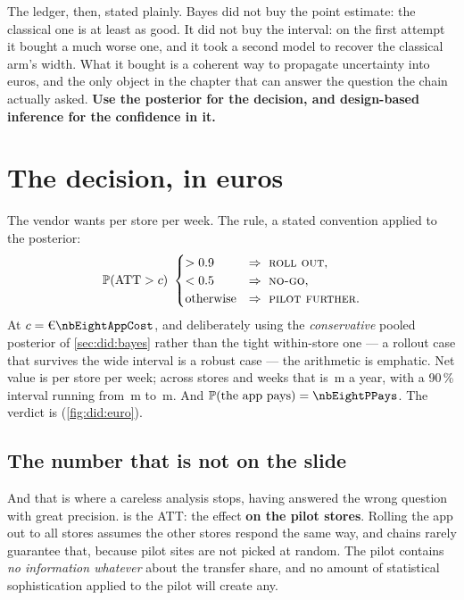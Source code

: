 The ledger, then, stated plainly. Bayes did not buy the point estimate: the classical one is at
least as good. It did not buy the interval: on the first attempt it bought a much worse one, and it
took a second model to recover the classical arm's width. What it bought is a coherent way to
propagate uncertainty into euros, and the only object in the chapter that can answer the question
the chain actually asked. \textbf{Use the posterior for the decision, and design-based inference for
the confidence in it.}

\section{The decision, in euros}
\label{sec:did:euro}

The vendor wants \eur{\nbEightAppCost} per store per week. The rule, a stated convention applied to
the posterior:
%
\begin{equation}
  \operatorname{\mathbb{P}}(\text{ATT} > c)\ \begin{cases}
    > 0.9 & \Rightarrow\ \textsc{roll out},\\
    < 0.5 & \Rightarrow\ \textsc{no-go},\\
    \text{otherwise} & \Rightarrow\ \textsc{pilot further}.
  \end{cases}
  \label{eq:did:rule}
\end{equation}
%
At $c = \eur{\nbEightAppCost}$, and deliberately using the \emph{conservative} pooled posterior of
\cref{sec:did:bayes} rather than the tight within-store one --- a rollout case that survives the wide
interval is a robust case --- the arithmetic is emphatic. Net value is \eur{\nbEightNetMean} per
store per week; across \nbEightNChain{} stores and \nbEightWeeksYear{} weeks that is
\eur{\nbEightAnnualMeanM}\,m a year, with a 90\,\% interval running from
\eur{\nbEightAnnualLoM}\,m to \eur{\nbEightAnnualHiM}\,m. And
$\Prob(\text{the app pays}) = \nbEightPPays$. The verdict is \textbf{\nbEightDecision}
(\cref{fig:did:euro}).



\subsection*{The number that is not on the slide}

And that is where a careless analysis stops, having answered the wrong question with great
precision.  is the ATT: the effect \textbf{on the pilot stores}. Rolling the
app out to all \nbEightNChain{} stores assumes the other stores respond the same way, and chains
rarely guarantee that, because pilot sites are not picked at random. The pilot contains \emph{no
information whatever} about the transfer share, and no amount of statistical sophistication applied
to the pilot will create any.

